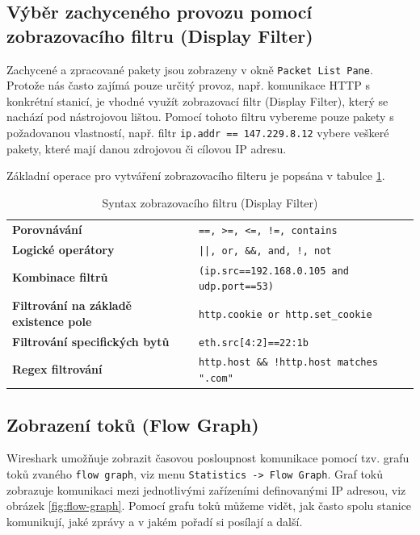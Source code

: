 \subsection{Výběr zachyceného provozu pomocí zobrazovacího filtru (Display Filter)}
Zachycené a zpracované pakety jsou zobrazeny v okně {\tt Packet List Pane}. Protože nás často zajímá pouze určitý provoz, např. komunikace HTTP s konkrétní stanicí, je vhodné využít zobrazovací filtr (Display Filter), který se nachází pod nástrojovou lištou. Pomocí tohoto filtru vybereme pouze pakety s požadovanou vlastností, např. filtr {\tt ip.addr == 147.229.8.12} vybere veškeré pakety, které mají danou zdrojovou či cílovou IP adresu. 

Základní operace pro vytváření zobrazovacího filteru je popsána v tabulce \ref{tab:display-filter}. 
\begin{center}
  \begin{table}[h]
    \centering
    \def\arraystretch{1.2}
    \begin{tabular}{|l|l|}
      \hline
      \textbf{Porovnávání} & \texttt{==, >=, <=, !=, contains}\\
      \textbf{Logické operátory} & \texttt{||, or, \&\&, and, !, not}\\
      \textbf{Kombinace filtrů} & \texttt{(ip.src==192.168.0.105 and udp.port==53)}\\
      \textbf{Filtrování na základě existence pole} & \texttt{http.cookie or http.set\_cookie}\\
      \textbf{Filtrování specifických bytů} & \texttt{eth.src[4:2]==22:1b}\\
      \textbf{Regex filtrování} & \texttt{http.host \&\& !http.host matches ".com"}\\
      \hline
    \end{tabular}
    \caption{Syntax zobrazovacího filtru (Display Filter)}\label{tab:display-filter}
  \end{table}
\end{center}

\subsection{Zobrazení toků (Flow Graph)}
Wireshark umožňuje zobrazit časovou posloupnost komunikace pomocí tzv. grafu toků zvaného \texttt{flow graph}, viz menu \texttt{Statistics -> Flow Graph}. Graf toků zobrazuje komunikaci mezi jednotlivými zařízeními definovanými IP adresou, viz obrázek \ref{fig:flow-graph}. Pomocí grafu toků můžeme vidět, jak často spolu stanice komunikují, jaké zprávy a v jakém pořadí si posílají a další.

